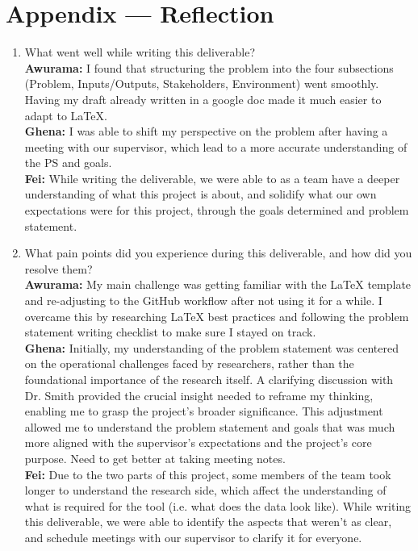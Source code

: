 \documentclass{article}
\begin{document}
\newpage{}

\section*{Appendix --- Reflection}


% 

\begin{enumerate}
    \item What went well while writing this deliverable? \\
    \textbf{Awurama:} I found that structuring the problem into the four subsections (Problem, Inputs/Outputs, Stakeholders, Environment) went smoothly. Having my draft already written in a google doc made it much easier to adapt to LaTeX. 
    \\\textbf{Ghena:} I was able to shift my perspective on the problem after having a meeting with our supervisor, which lead to a more accurate understanding of the PS and goals.
    \\\textbf{Fei:} While writing the deliverable, we were able to as a team have a deeper understanding of what this project is about, and solidify what our own expectations were for this project, through the goals determined and problem statement.

    \item What pain points did you experience during this deliverable, and how
    did you resolve them? \\
    \textbf{Awurama:} My main challenge was getting familiar with the LaTeX template and re-adjusting to the GitHub workflow after not using it for a while. I overcame this by researching LaTeX best practices and following the problem statement writing checklist to make sure I stayed on track.  
    \\\textbf{Ghena:} Initially, my understanding of the problem statement was centered on the operational challenges faced by researchers, rather than the foundational importance of the research itself. A clarifying discussion with Dr. Smith provided the crucial insight needed to reframe my thinking, enabling me to grasp the project's broader significance. This adjustment allowed me to understand the problem statement and goals that was much more aligned with the supervisor's expectations and the project's core purpose. Need to get better at taking meeting notes.
    \\\textbf{Fei:} Due to the two parts of this project, some members of the team took longer to understand the research side, which affect the understanding of what is required for the tool (i.e. what does the data look like). While writing this deliverable, we were able to identify the aspects that weren’t as clear, and schedule meetings with our supervisor to clarify it for everyone. 
    

\end{enumerate}
\end{document}
